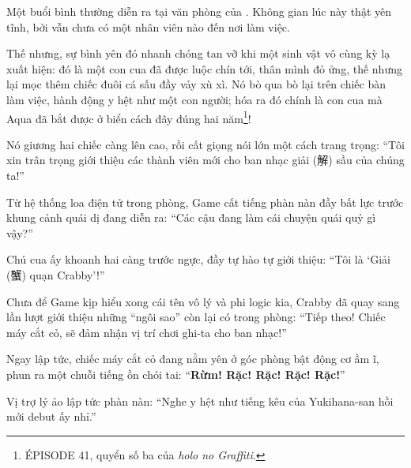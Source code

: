 \documentclass[../main.tex]{subfiles}
\begin{document}

Một buổi bình thường diễn ra tại văn phòng của \hll. Không gian lúc này thật yên tĩnh, bởi vẫn chưa có một nhân viên nào đến nơi làm việc.

Thế nhưng, sự bình yên đó nhanh chóng tan vỡ khi một sinh vật vô cùng kỳ lạ xuất hiện: đó là một con cua đã được luộc chín tới, thân mình đỏ ửng, thế nhưng lại mọc thêm chiếc đuôi cá sấu đầy vảy xù xì. Nó bò qua bò lại trên chiếc bàn làm việc, hành động y hệt như một con người; hóa ra đó chính là con cua mà Aqua đã bắt được ở biển cách đây đúng hai năm\footnote{{\flaregothic ÉPISODE 41}, quyển số ba của \textit{holo no Graffiti}.}!

Nó giương hai chiếc càng lên cao, rồi cất giọng nói lớn một cách trang trọng: ``Tôi xin trân trọng giới thiệu các thành viên mới cho ban nhạc giải (解) sầu của chúng ta!''

Từ hệ thống loa điện tử trong phòng, Game cất tiếng phàn nàn đầy bất lực trước khung cảnh quái dị đang diễn ra: ``Các cậu đang làm cái chuyện quái quỷ gì vậy?''

Chú cua ấy khoanh hai càng trước ngực, đầy tự hào tự giới thiệu: ``Tôi là `Giải (蟹) quạn Crabby'!''


Chưa để Game kịp hiểu xong cái tên vô lý và phi logic kia, Crabby đã quay sang lần lượt giới thiệu những ``ngôi sao'' còn lại có trong phòng: ``Tiếp theo! Chiếc máy cắt cỏ, sẽ đảm nhận vị trí chơi ghi-ta cho ban nhạc!''

Ngay lập tức, chiếc máy cắt cỏ đang nằm yên ở góc phòng bật động cơ ầm ĩ, phun ra một chuỗi tiếng ồn chói tai: ``\textbf{Rừm! Rặc! Rặc! Rặc! Rặc!}''


Vị trợ lý ảo lập tức phàn nàn: ``Nghe y hệt như tiếng kêu của Yukihana-san hồi mới debut ấy nhỉ.''
\end{document}
